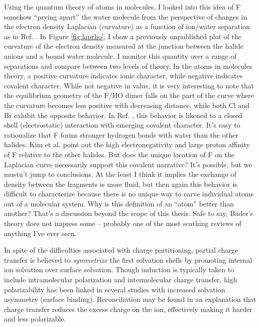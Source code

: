 \begin{intro}
   Using the quantum theory of atoms in molecules\cite{bader1990book}, I looked into this idea of F\sur{-} somehow ``prying apart'' the water molecule from the perspective of changes 
   in the electron density Laplacian (curvature) as a function of ion/water separation as in Ref. \cite{espinosa}. In Figure \ref{fig:laprho}, I show a previously unpublished plot
   of the curvature of the electron density measured at the junction between the halide anions and a bound water molecule. I monitor this quantity over a range of separations and compare 
   between two levels 
   of theory. In the atoms in molecules theory, a positive curvature indicates ionic character, while negative indicates covalent character. While not negative in value, it is very 
   interesting to note that the equilibrium geometry of the F\sur{-}/HO dimer falls on the part of the curve where the curvature becomes less positive with decreasing distance, 
   while both Cl\sur{-} and Br\sur{-} exhibit the opposite behavior. In Ref. \cite{espinosa}, this behavior is likened to a closed shell (electrostatic) interaction with emerging 
   covalent character. It's easy to rationalize that F\sur{-} forms stronger hydrogen bonds with water than the other halides. Kim et al. point out the high electronegativity and large 
   proton affinity of F\sur{-} relative to the other halides\cite{kim2000smallall}. But does the unique location of F\sur{-} on the Laplacian curve necessarily support this covalent
   narrative? It's possible, but we mustn't jump to conclusions. At the least I think it implies the exchange of density between the fragments is more fluid, but then again this behavior
   is difficult to characterize because there is no unique way to carve individual atoms out of a molecular system. Why is this definition of an ``atom'' better than another? That's a
   discussion beyond the scope of this thesis. Safe to say, Bader's theory does not impress some\cite{emptor} -- probably one of the most scathing reviews of anything I've ever seen.
   
   In spite of the difficulties associated with charge partitioning, partial charge transfer is believed to \emph{symmetrize} the first solvation shells by promoting internal ion 
   solvation over surface solvation\cite{rogers2010ctpolar,soniat2012ct}. Though induction is typically taken to include intramolecular polarization and intermolecular charge transfer, 
   high polarizability has been linked in several studies with increased solvation asymmetry (surface binding)\cite{carignano1997polarizable,dang1993molecular,herce2005surface,ohrn2007many,perera1992structure}. 
   Reconciliation may be found in an explanation that charge transfer reduces the excess charge on the ion, effectively making it harder and less polarizable. 
   

\end{intro}
